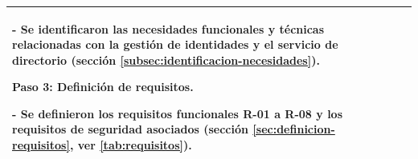 \begin{table}[htbp]
\begin{tabular}{
		|>{\raggedright\arraybackslash}p{}
		|>{\raggedright\arraybackslash}p{}|}
		- Se identificaron las necesidades funcionales y técnicas relacionadas con la gestión de identidades y el servicio de directorio (sección \textcolor[HTML]{1B6B93}{\ref{subsec:identificacion-necesidades}}).\par\vspace{0.6em}
		\textbf{Paso 3: Definición de requisitos.}\par\vspace{0.4em}
		- Se definieron los requisitos funcionales R-01 a R-08 y los requisitos de seguridad asociados (sección \textcolor[HTML]{1B6B93}{\ref{sec:definicion-requisitos}}, ver \autoref{tab:requisitos}).                                                                                                                                                                                                       \\
		\hline
	\end{tabular}
\end{table}

